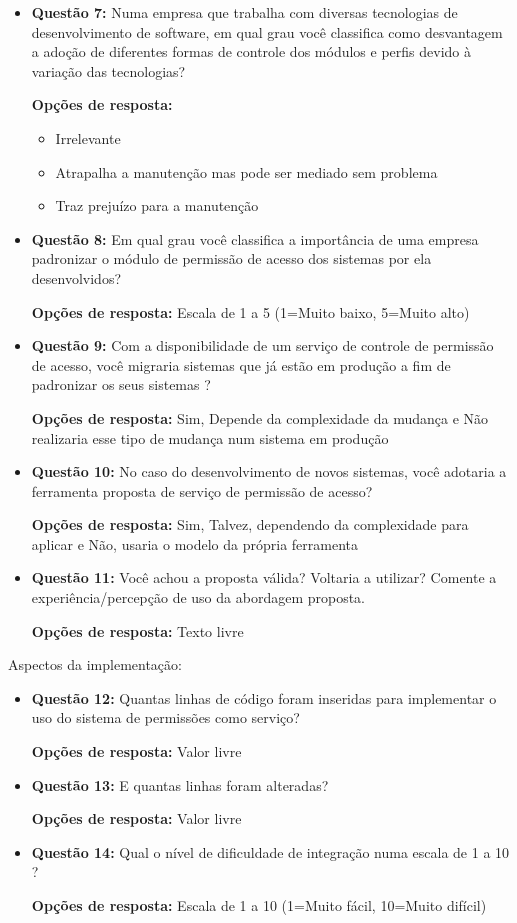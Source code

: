 \begin{itemize}
\item \textbf{Questão 7:} Numa empresa que trabalha com diversas tecnologias de desenvolvimento de software, em qual grau você classifica como desvantagem a adoção de diferentes formas de controle dos módulos e perfis devido à variação das tecnologias?

\textbf{Opções de resposta:}
\begin{itemize}
\item Irrelevante
\item Atrapalha a manutenção mas pode ser mediado sem problema
\item Traz prejuízo para a manutenção
\end{itemize}
\item \textbf{Questão 8:} Em qual grau você classifica a importância de uma empresa padronizar o módulo de permissão de acesso dos sistemas por ela desenvolvidos?

\textbf{Opções de resposta:} Escala de 1 a 5 (1=Muito baixo, 5=Muito alto)

\item \textbf{Questão 9:} Com a disponibilidade de um serviço de controle de permissão de acesso, você migraria sistemas que já estão em produção a fim de padronizar os seus sistemas ?

\textbf{Opções de resposta:} Sim, Depende da complexidade da mudança e Não realizaria esse tipo de mudança num sistema em produção

\item \textbf{Questão 10:} No caso do desenvolvimento de novos sistemas, você adotaria a ferramenta proposta de serviço de permissão de acesso?

\textbf{Opções de resposta:} Sim, Talvez, dependendo da complexidade para aplicar e Não, usaria o modelo da própria ferramenta

\item \textbf{Questão 11:} Você achou a proposta válida? Voltaria a utilizar? Comente a experiência/percepção de uso da abordagem proposta.

\textbf{Opções de resposta:} Texto livre

\end{itemize}

Aspectos da implementação:
\begin{itemize}

\item \textbf{Questão 12:} Quantas linhas de código foram inseridas para implementar o uso do sistema de permissões como serviço?

\textbf{Opções de resposta:} Valor livre

\item \textbf{Questão 13:} E quantas linhas foram alteradas?

\textbf{Opções de resposta:} Valor livre

\item \textbf{Questão 14:} Qual o nível de dificuldade de integração numa escala de 1 a 10 ?

\textbf{Opções de resposta:} Escala de 1 a 10 (1=Muito fácil, 10=Muito difícil)


\end{itemize}


